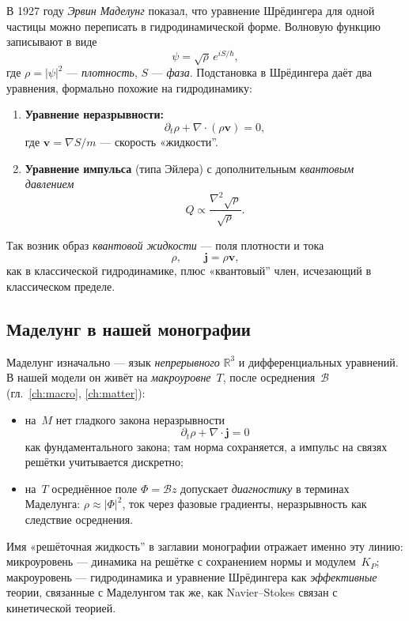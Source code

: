 В 1927 году \emph{Эрвин Маделунг} показал, что уравнение Шрёдингера для одной частицы
можно переписать в гидродинамической форме.
Волновую функцию записывают в виде
\[
\psi=\sqrt{\rho}\,e^{iS/\hbar},
\]
где $\rho=|\psi|^2$ --- \emph{плотность}, $S$ --- \emph{фаза}.
Подстановка в Шрёдингера даёт два уравнения, формально похожие на гидродинамику:

\begin{enumerate}
\item \textbf{Уравнение неразрывности:}
\[
\partial_t\rho + \nabla\cdot(\rho\mathbf{v})=0,
\]
где $\mathbf{v}=\nabla S/m$ --- скорость «жидкости''.
\item \textbf{Уравнение импульса} (типа Эйлера) с дополнительным
\emph{квантовым давлением}
\[
Q \propto \frac{\nabla^2\sqrt{\rho}}{\sqrt{\rho}}.
\]
\end{enumerate}

Так возник образ \emph{квантовой жидкости} --- поля плотности и тока
\[
\rho,\qquad \mathbf{j}=\rho\mathbf{v},
\]
как в классической гидродинамике,
плюс «квантовый'' член, исчезающий в классическом пределе.

\subsection{Маделунг в нашей монографии}

Маделунг изначально --- язык \emph{непрерывного} $\mathbb{R}^3$ и дифференциальных уравнений.
В нашей модели он живёт на \emph{макроуровне}~$T$, после осреднения~$\mathcal{B}$
(гл.~\ref{ch:macro}, \ref{ch:matter}):

\begin{itemize}
\item на~$M$ нет гладкого закона неразрывности
\[
\partial_t\rho+\nabla\cdot\mathbf{j}=0
\]
как фундаментального закона;
  там норма сохраняется, а импульс на связях решётки учитывается дискретно;
\item на~$T$ осреднённое поле $\Phi=\mathcal{B}z$ допускает \emph{диагностику}
  в терминах Маделунга: $\rho\approx|\Phi|^2$, ток через фазовые градиенты,
  неразрывность как следствие осреднения.
\end{itemize}

Имя «решёточная жидкость'' в заглавии монографии отражает именно эту линию:
микроуровень --- динамика на решётке с сохранением нормы и модулем~$K_P$;
макроуровень --- гидродинамика и уравнение Шрёдингера как \emph{эффективные} теории,
связанные с Маделунгом так же, как Navier--Stokes связан с кинетической теорией.

